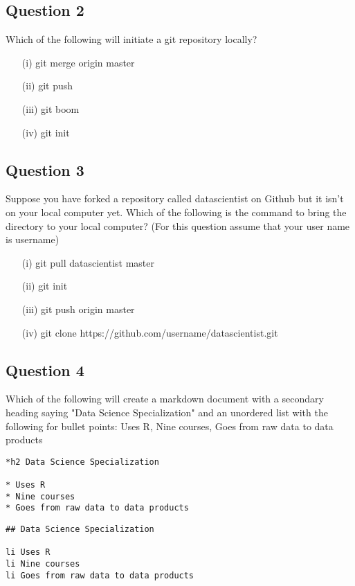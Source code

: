 \documentclass[12pt]{article}
\begin{document}
\subsection*{Question 2}
Which of the following will initiate a git repository locally?

\begin{itemize}
\item[(i)]  git merge origin master
\item[(ii)]  git push
\item[(iii)]  git boom
\item[(iv)]  git init
\end{itemize}
\subsection*{Question 3}
Suppose you have forked a repository called datascientist on Github but it isn't on your local computer yet. Which of the following is the command to bring the directory to your local computer? (For this question assume that your user name is username)

\begin{itemize}
\item[(i)] git pull datascientist master
\item[(ii)] git init
\item[(iii)] git push origin master
\item[(iv)] git clone https://github.com/username/datascientist.git
\end{itemize}
\subsection*{Question 4}
Which of the following will create a markdown document with a secondary heading saying "Data Science Specialization" and an unordered list with the following for bullet points: Uses R, Nine courses, Goes from raw data to data products
\begin{framed}
\begin{verbatim}
*h2 Data Science Specialization 

* Uses R 
* Nine courses 
* Goes from raw data to data products
\end{verbatim}
\end{framed}

\begin{framed}
\begin{verbatim}
## Data Science Specialization 

li Uses R 
li Nine courses 
li Goes from raw data to data products
\end{verbatim}
\end{framed}
\end{document}
